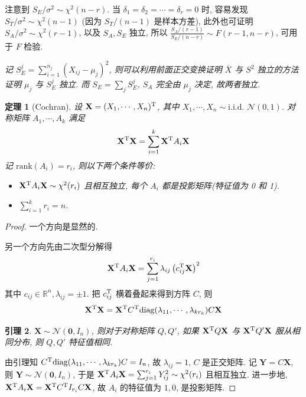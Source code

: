 \documentclass[8pt]{article}
\theoremstyle{compact}
\newtheorem{theorem}{定理}
\newtheorem{lemma}[theorem]{引理}
\begin{document}
注意到 $S_E / \sigma^2 \sim \chi^2(n - r)$. 当 $\delta_1 = \delta_2 = \cdots = \delta_r = 0$ 时, 容易发现 $S_T / \sigma^2 \sim \chi^2(n - 1)$ (因为 $S_T / (n-1)$ 是样本方差), 此外也可证明 $S_A / \sigma^2 \sim \chi^2(r - 1)$, 以及 $S_A, S_E$ 独立, 所以 $\frac{S_A / (r - 1)}{S_E / (n - r)} \sim F(r - 1, n - r)$, 可用于 $F$ 检验. 

\textit{记 $S_E^j = \sum_{i=1}^{n_j} (X_{ij} - \mu_j)^2$, 则可以利用前面正交变换证明 $\overline{X}$ 与 $S^2$ 独立的方法证明 $\mu_j$ 与 $S_E^j$ 独立. 而 $S_E = \sum_j S_E^j$, $S_A$ 完全由 $\mu_j$ 决定, 故两者独立.}

\begin{theorem}[Cochran]
	设 $\mathbf X = (X_1, \cdots, X_n)^{\text T}$, 其中 $X_1, \cdots, X_n \sim \text{i.i.d. } \mathcal N(0, 1)$. 对称矩阵 $A_1, \cdots, A_k$ 满足 $$\mathbf X^{\text T}\mathbf X = \sum_{i=1}^{k} \mathbf X^{\text T}A_i\mathbf X$$ 记 $\text{rank}(A_i) = r_i$, 则以下两个条件等价: \begin{itemize}
		\item $\mathbf X^{\text T}A_i\mathbf X \sim \chi^2(r_i)$ 且相互独立, 每个 $A_i$ 都是投影矩阵(特征值为 0 和 1).
		\item $\sum_{i=1}^{k} r_i = n$. 
	\end{itemize}
\end{theorem}
\begin{proof}
	一个方向是显然的. 

	另一个方向先由二次型分解得 $$\mathbf X^{\text T}A_i\mathbf X = \sum_{j=1}^{r_i}\lambda_{ij}\left(c_{ij}^{\text T}\mathbf X\right)^2$$ 其中 $c_{ij} \in \mathbb R^n, \lambda_{ij} = \pm 1$. 把 $c_{ij}^{\text T}$ 横着叠起来得到方阵 $C$, 则 $$\mathbf X^{\text T}\mathbf X = \mathbf X^{\text T}C^{\text T}\text{diag}(\lambda_{11}, \cdots, \lambda_{kr_k})C\mathbf X$$
	\begin{lemma}
		$\mathbf X \sim \mathcal N(\mathbf 0, I_n)$, 则对于对称矩阵 $Q, Q'$, 如果 $\mathbf X^{\text T}Q\mathbf X$ 与 $\mathbf X^{\text T}Q'\mathbf X$ 服从相同分布, 则 $Q, Q'$ 特征值相同.
	\end{lemma}
	由引理知 $C^{\text T}\text{diag}(\lambda_{11}, \cdots, \lambda_{kr_k})C = I_n$, 故 $\lambda_{ij} = 1$, $C$ 是正交矩阵. 记 $\mathbf Y = C\mathbf X$, 则 $\mathbf Y \sim \mathcal N(\mathbf 0, I_n)$, 于是 $\mathbf X^{\text T}A_i\mathbf X = \sum_{j=1}^{r_i}Y_{ij}^2 \sim \chi^2(r_i)$ 且相互独立. 进一步地, $\mathbf X^{\text T}A_i\mathbf X = \mathbf X^{\text T}C^{\text T}I_{r_i}C\mathbf X$, 故 $A_i$ 的特征值为 $1, 0$, 是投影矩阵.
\end{proof}
\end{document}
